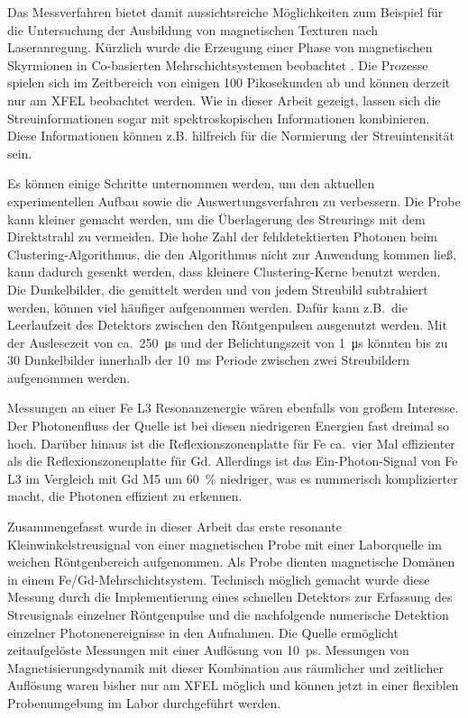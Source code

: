 \noindent
Das Messverfahren bietet damit aussichtsreiche Möglichkeiten zum Beispiel für die Untersuchung der Ausbildung von magnetischen Texturen nach Laseranregung. Kürzlich wurde die Erzeugung einer Phase von magnetischen Skyrmionen in Co-basierten Mehrschichtsystemen beobachtet \cite{buttner_observation_2021}. Die Prozesse spielen sich im Zeitbereich von einigen 100 Pikosekunden ab und können derzeit nur am XFEL beobachtet werden. Wie in dieser Arbeit gezeigt, lassen sich die Streuinformationen sogar mit spektroskopischen Informationen kombinieren. Diese Informationen können z.B. hilfreich für die Normierung der Streuintensität sein.

\noindent
Es können einige Schritte unternommen werden, um den aktuellen experimentellen Aufbau sowie die Auswertungsverfahren zu verbessern. Die Probe kann kleiner gemacht werden, um die Überlagerung des Streurings mit dem Direktstrahl zu vermeiden. Die hohe Zahl der fehldetektierten Photonen beim Clustering-Algorithmus, die den Algorithmus nicht zur Anwendung kommen ließ, kann dadurch gesenkt werden, dass kleinere Clustering-Kerne benutzt werden. Die Dunkelbilder, die gemittelt werden und von jedem Streubild subtrahiert werden, können viel häufiger aufgenommen werden. Dafür kann z.B.\ die Leerlaufzeit des Detektors zwischen den Röntgenpulsen ausgenutzt werden. Mit der Auslesezeit von ca.\ \SI{250}{\micro\second} und der Belichtungszeit von \SI{1}{\micro\second} könnten bis zu 30 Dunkelbilder innerhalb der \SI{10}{\milli\second} Periode zwischen zwei Streubildern aufgenommen werden.

\noindent
Messungen an einer Fe L3 Resonanzenergie wären ebenfalls von großem Interesse. Der Photonenfluss der Quelle ist bei diesen niedrigeren Energien fast dreimal so hoch. Darüber hinaus ist die Reflexionszonenplatte für Fe ca.\ vier Mal effizienter als die Reflexionszonenplatte für Gd. Allerdings ist das Ein-Photon-Signal von Fe L3 im Vergleich mit Gd M5 um \SI{60}{\percent} niedriger, was es nummerisch komplizierter macht, die Photonen effizient zu erkennen.  

\noindent
Zusammengefasst wurde in dieser Arbeit das erste resonante Kleinwinkelstreusignal von einer magnetischen Probe mit einer Laborquelle im weichen Röntgenbereich aufgenommen. Als Probe dienten magnetische Domänen in einem Fe/Gd-Mehrschichtsystem. Technisch möglich gemacht wurde diese Messung durch die Implementierung eines schnellen Detektors zur Erfassung des Streusignals einzelner Röntgenpulse und die nachfolgende numerische Detektion einzelner Photonenereignisse in den Aufnahmen. Die Quelle ermöglicht zeitaufgelöste Messungen mit einer Auflösung von \SI{10}{ps}. Messungen von Magnetisierungsdynamik mit dieser Kombination aus räumlicher und zeitlicher Auflösung waren bisher nur am XFEL möglich und können jetzt in einer flexiblen Probenumgebung im Labor durchgeführt werden.